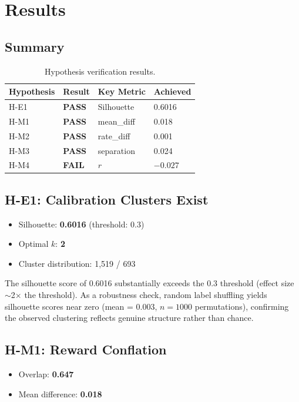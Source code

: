 \section{Results}

\subsection{Summary}

\begin{table}[h]
\centering
\begin{tabular}{@{}llll@{}}
\toprule
Hypothesis & Result & Key Metric & Achieved \\
\midrule
H-E1 & \textbf{PASS} & Silhouette & 0.6016 \\
H-M1 & \textbf{PASS} & mean\_diff & 0.018 \\
H-M2 & \textbf{PASS} & rate\_diff & 0.001 \\
H-M3 & \textbf{PASS} & separation & 0.024 \\
H-M4 & \textbf{FAIL} & $r$ & $-0.027$ \\
\bottomrule
\end{tabular}
\caption{Hypothesis verification results.}
\label{tab:results}
\end{table}

\subsection{H-E1: Calibration Clusters Exist}

\begin{itemize}
    \item Silhouette: \textbf{0.6016} (threshold: 0.3)
    \item Optimal $k$: \textbf{2}
    \item Cluster distribution: 1,519 / 693
\end{itemize}

The silhouette score of 0.6016 substantially exceeds the 0.3 threshold (effect size $\sim$2$\times$ the threshold). As a robustness check, random label shuffling yields silhouette scores near zero (mean = 0.003, $n = 1000$ permutations), confirming the observed clustering reflects genuine structure rather than chance.

\subsection{H-M1: Reward Conflation}

\begin{itemize}
    \item Overlap: \textbf{0.647}
    \item Mean difference: \textbf{0.018}
\end{itemize}

